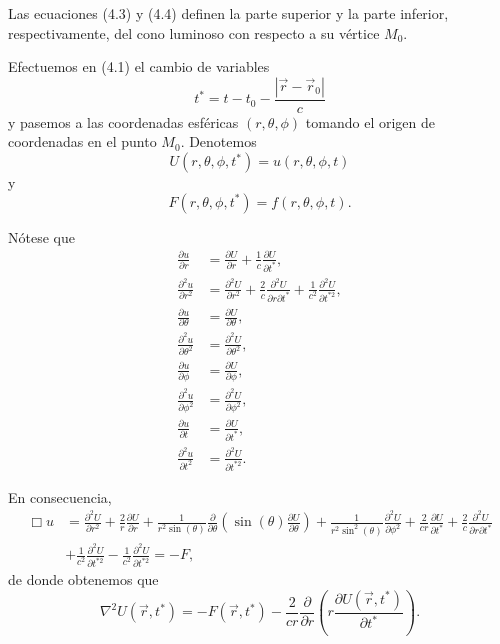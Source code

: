 \documentclass[12pt,a4paper]{book}
\begin{document}
Las ecuaciones (4.3) y (4.4) definen la parte superior y la parte inferior, respectivamente, del cono luminoso con respecto a su vértice $M_0$.

Efectuemos en (4.1) el cambio de variables
\begin{equation}
t^* = t - t_0 - \frac{|\vec{r} - \vec{r}_0|}{c}
\end{equation}
y pasemos a las coordenadas esféricas $(r, \theta, \phi)$ tomando el origen de coordenadas en el punto $M_0$. Denotemos
\begin{equation}
U(r, \theta, \phi, t^*) = u(r, \theta, \phi, t)
\end{equation}
y
\begin{equation}
F(r, \theta, \phi, t^*) = f(r, \theta, \phi, t).
\end{equation}

Nótese que
\begin{align}
\frac{\partial u}{\partial r} &= \frac{\partial U}{\partial r} + \frac{1}{c}\frac{\partial U}{\partial t^*}, \\
\frac{\partial^2 u}{\partial r^2} &= \frac{\partial^2 U}{\partial r^2} + \frac{2}{c}\frac{\partial^2 U}{\partial r \partial t^*} + \frac{1}{c^2}\frac{\partial^2 U}{\partial t^{*2}}, \\
\frac{\partial u}{\partial \theta} &= \frac{\partial U}{\partial \theta}, \\
\frac{\partial^2 u}{\partial \theta^2} &= \frac{\partial^2 U}{\partial \theta^2}, \\
\frac{\partial u}{\partial \phi} &= \frac{\partial U}{\partial \phi}, \\
\frac{\partial^2 u}{\partial \phi^2} &= \frac{\partial^2 U}{\partial \phi^2}, \\
\frac{\partial u}{\partial t} &= \frac{\partial U}{\partial t^*}, \\
\frac{\partial^2 u}{\partial t^2} &= \frac{\partial^2 U}{\partial t^{*2}}.
\end{align}

En consecuencia,
\begin{align}
\Box u &= \frac{\partial^2 U}{\partial r^2} + \frac{2}{r}\frac{\partial U}{\partial r} + \frac{1}{r^2 \sin(\theta)}\frac{\partial}{\partial \theta}\left(\sin(\theta)\frac{\partial U}{\partial \theta}\right) + \frac{1}{r^2 \sin^2(\theta)}\frac{\partial^2 U}{\partial \phi^2} + \frac{2}{cr}\frac{\partial U}{\partial t^*} + \frac{2}{c}\frac{\partial^2 U}{\partial r \partial t^*} \nonumber \\
&+ \frac{1}{c^2}\frac{\partial^2 U}{\partial t^{*2}} - \frac{1}{c^2}\frac{\partial^2 U}{\partial t^{*2}} = -F,
\end{align}
de donde obtenemos que
\begin{equation}
\nabla^2 U(\vec{r}, t^*) = -F(\vec{r}, t^*) - \frac{2}{cr}\frac{\partial}{\partial r}\left(r\frac{\partial U(\vec{r}, t^*)}{\partial t^*}\right).
\end{equation}
\end{document}
